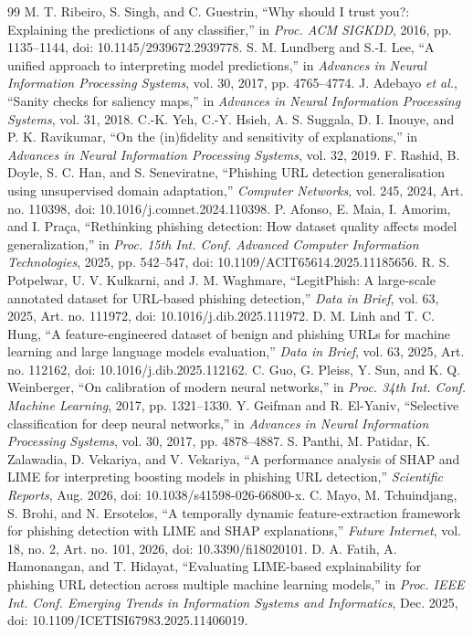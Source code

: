 \documentclass[conference,letterpaper]{IEEEtran}
\begin{document}
\begin{thebibliography}{99}
 M. T. Ribeiro, S. Singh, and C. Guestrin, ``Why should I trust you?: Explaining the predictions of any classifier,'' in \emph{Proc. ACM SIGKDD}, 2016, pp. 1135--1144, doi: 10.1145/2939672.2939778.
 S. M. Lundberg and S.-I. Lee, ``A unified approach to interpreting model predictions,'' in \emph{Advances in Neural Information Processing Systems}, vol. 30, 2017, pp. 4765--4774.
 J. Adebayo \emph{et al.}, ``Sanity checks for saliency maps,'' in \emph{Advances in Neural Information Processing Systems}, vol. 31, 2018.
 C.-K. Yeh, C.-Y. Hsieh, A. S. Suggala, D. I. Inouye, and P. K. Ravikumar, ``On the (in)fidelity and sensitivity of explanations,'' in \emph{Advances in Neural Information Processing Systems}, vol. 32, 2019.
 F. Rashid, B. Doyle, S. C. Han, and S. Seneviratne, ``Phishing URL detection generalisation using unsupervised domain adaptation,'' \emph{Computer Networks}, vol. 245, 2024, Art. no. 110398, doi: 10.1016/j.comnet.2024.110398.
 P. Afonso, E. Maia, I. Amorim, and I. Praça, ``Rethinking phishing detection: How dataset quality affects model generalization,'' in \emph{Proc. 15th Int. Conf. Advanced Computer Information Technologies}, 2025, pp. 542--547, doi: 10.1109/ACIT65614.2025.11185656.
 R. S. Potpelwar, U. V. Kulkarni, and J. M. Waghmare, ``LegitPhish: A large-scale annotated dataset for URL-based phishing detection,'' \emph{Data in Brief}, vol. 63, 2025, Art. no. 111972, doi: 10.1016/j.dib.2025.111972.
 D. M. Linh and T. C. Hung, ``A feature-engineered dataset of benign and phishing URLs for machine learning and large language models evaluation,'' \emph{Data in Brief}, vol. 63, 2025, Art. no. 112162, doi: 10.1016/j.dib.2025.112162.
 C. Guo, G. Pleiss, Y. Sun, and K. Q. Weinberger, ``On calibration of modern neural networks,'' in \emph{Proc. 34th Int. Conf. Machine Learning}, 2017, pp. 1321--1330.
 Y. Geifman and R. El-Yaniv, ``Selective classification for deep neural networks,'' in \emph{Advances in Neural Information Processing Systems}, vol. 30, 2017, pp. 4878--4887.
 S. Panthi, M. Patidar, K. Zalawadia, D. Vekariya, and V. Vekariya, ``A performance analysis of SHAP and LIME for interpreting boosting models in phishing URL detection,'' \emph{Scientific Reports}, Aug. 2026, doi: 10.1038/s41598-026-66800-x.
 C. Mayo, M. Tchuindjang, S. Brohi, and N. Ersotelos, ``A temporally dynamic feature-extraction framework for phishing detection with LIME and SHAP explanations,'' \emph{Future Internet}, vol. 18, no. 2, Art. no. 101, 2026, doi: 10.3390/fi18020101.
 D. A. Fatih, A. Hamonangan, and T. Hidayat, ``Evaluating LIME-based explainability for phishing URL detection across multiple machine learning models,'' in \emph{Proc. IEEE Int. Conf. Emerging Trends in Information Systems and Informatics}, Dec. 2025, doi: 10.1109/ICETISI67983.2025.11406019.
\end{thebibliography}
\end{document}

